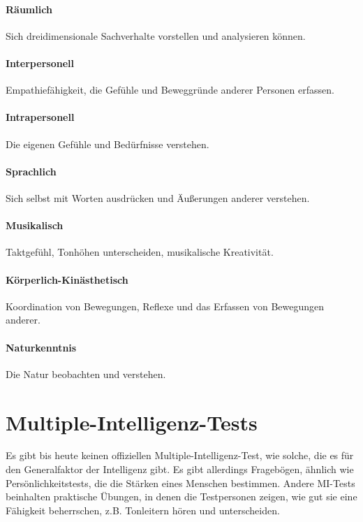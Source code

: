 \paragraph{Räumlich}
Sich dreidimensionale Sachverhalte vorstellen und analysieren können.
\paragraph{Interpersonell}
Empathiefähigkeit, die Gefühle und Beweggründe anderer Personen erfassen.
\paragraph{Intrapersonell}
Die eigenen Gefühle und Bedürfnisse verstehen.
\paragraph{Sprachlich}
Sich selbst mit Worten ausdrücken und Äußerungen anderer verstehen.
\paragraph{Musikalisch}
Taktgefühl, Tonhöhen unterscheiden, musikalische Kreativität.
\paragraph{Körperlich-Kinästhetisch}
Koordination von Bewegungen, Reflexe und das Erfassen von Bewegungen anderer.
\paragraph{Naturkenntnis}
Die Natur beobachten und verstehen.

\section{Multiple-Intelligenz-Tests}
Es gibt bis heute keinen offiziellen Multiple-Intelligenz-Test, wie solche, die es für den Generalfaktor der Intelligenz gibt. Es gibt allerdings Fragebögen, ähnlich wie Persönlichkeitstests, die die \glqq Stärken\grqq{} eines Menschen bestimmen. Andere MI-Tests beinhalten praktische Übungen, in denen die Testpersonen zeigen, wie gut sie eine Fähigkeit beherrschen, z.B. Tonleitern hören und unterscheiden. \cite{mi_tests}
